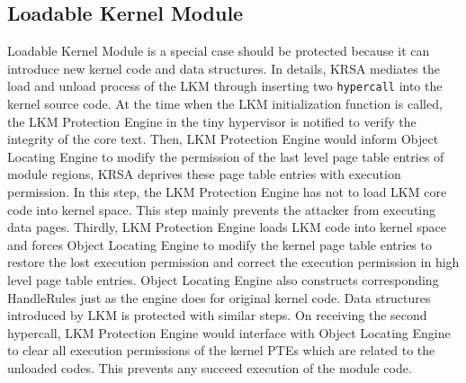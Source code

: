 \documentclass[conference]{IEEEtran}
\begin{document}
\subsection{Loadable Kernel Module} \label{sec:lkmimp}
Loadable Kernel Module is a special case should be protected because it can introduce new kernel code and data structures. 
In details, KRSA mediates the load and unload process of the LKM through inserting two \verb|hypercall| into the kernel source code. 
At the time when the LKM initialization function is called, the LKM Protection Engine in the tiny hypervisor is notified to verify the integrity of the core text.
Then, LKM Protection Engine would inform Object Locating Engine to modify the permission of the last level page table entries of module regions, KRSA deprives these page table entries with execution permission. In this step, the LKM Protection Engine has not to load LKM core code into kernel space. This step mainly prevents the attacker from executing data pages. Thirdly, LKM Protection Engine loads LKM code into kernel space and forces Object Locating Engine to modify the kernel page table entries to restore the lost execution permission and correct the execution permission in high level page table entries. Object Locating Engine also constructs corresponding HandleRules just as the engine does for original kernel code.  
Data structures introduced by LKM is protected with similar steps. 
On receiving the second hypercall, LKM Protection Engine would interface with Object Locating Engine to clear all execution permissions of the kernel PTEs which are related to the unloaded codes. This prevents any succeed execution of the module code.
\end{document}
